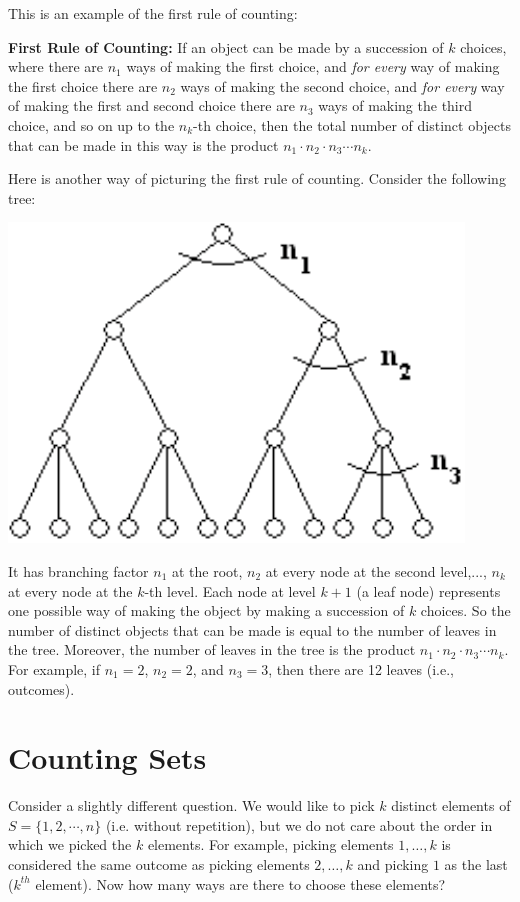 \documentclass[11pt,fleqn]{article}
\begin{document}
This is an example of the first rule of counting:

\noindent
{\bf First Rule of Counting:} If an object can be made by a 
succession of $k$ choices, where there are $n_1$ ways of making 
the first choice, and {\em for every} way of making the first
choice there are $n_2$ ways of making the second choice,
and {\em for every} way of making the first and second
choice there are $n_3$ ways of making the third choice,
and so on up to the $n_k$-th choice, then the total number 
of distinct objects that can be made in this way is the
product $n_1 \cdot n_2 \cdot n_3 \cdots n_k$. 

Here is another way of picturing the first rule of counting. 
Consider the following tree:

\includegraphics[bb = -40 0 0 160, scale=0.7]{counting}

It has branching factor $n_1$ at the root, $n_2$ at every node at the second level,...,
$n_k$ at every node at the $k$-th level. Each node at level $k+1$ (a leaf node)
represents one possible way of making the object by making a succession of $k$ choices. 
So the number of distinct objects that can be made is equal to the number of leaves in the 
tree. Moreover, the number of leaves in the tree is the product $n_1 \cdot n_2 \cdot n_3 \cdots n_k$.
For example, if $n_1 = 2$, $n_2 = 2$, and $n_3 = 3$, then there
are 12 leaves (i.e., outcomes). 

\section*{Counting Sets}
Consider a slightly different question. We would like to pick $k$
distinct elements of $S = \{1,2,\cdots,n\}$ (i.e. without repetition), but
we do not care about the order in which we picked the $k$ elements. For example, picking elements $1,\dots,k$
is considered the same outcome as picking elements $2,\dots,k$ and picking $1$ as the
last ($k^{th}$ element). Now how many ways are there to choose these elements? 
\end{document}
